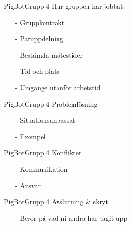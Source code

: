 \begin{frame}[fragile]{PigBot}{Grupp 4}
Hur gruppen har jobbat:
  \begin{itemize}
 \pause
    \item[-] Gruppkontrakt 
\pause
    \item[-] Paruppdelning
\pause
    \item[-] Bestämda mötestider
\pause
    \item[-] Tid och plats
\pause
    \item[-] Umgänge utanför arbetstid
  \end{itemize}
\end{frame}

\begin{frame}[fragile]{PigBot}{Grupp 4}
Problemlösning
  \begin{itemize}
 \pause
    \item[-] Situationsanpassat
\pause
    \item[-] Exempel
  \end{itemize}
\end{frame}

\begin{frame}[fragile]{PigBot}{Grupp 4}
Konflikter
  \begin{itemize}
 \pause
    \item[-] Kommunikation
\pause
    \item[-] Ansvar
  \end{itemize}
\end{frame}

\begin{frame}[fragile]{PigBot}{Grupp 4}
Avslutning \& skryt
  \begin{itemize}
 \pause
    \item[-] Beror på vad ni andra har tagit upp
  \end{itemize}
\end{frame}





